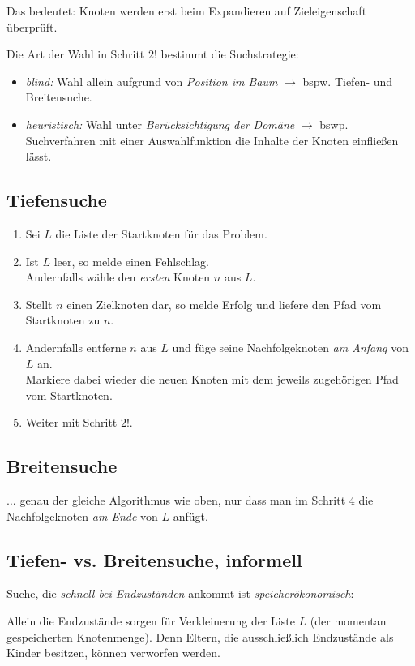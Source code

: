 \documentclass[runningheads,deutsch]{llncs}
\newenvironment{indentleft}[1]{
    \setlength{\leftskip}{#1}
}{
    \setlength{\leftskip}{0pt}
}
\begin{document}
Das bedeutet: Knoten werden erst beim Expandieren auf Zieleigenschaft überprüft.

Die Art der Wahl in Schritt $2!$ bestimmt die Suchstrategie:
\begin{itemize}
    \item \textit{blind:} Wahl allein aufgrund von \textit{Position im Baum} $\rightarrow$ bspw. Tiefen- und Breitensuche.
    \item \textit{heuristisch:} Wahl unter \textit{Berücksichtigung der Domäne} $\rightarrow$ bswp. Suchverfahren mit einer Auswahlfunktion die Inhalte der Knoten einfließen lässt.
\end{itemize}

\subsection{Tiefensuche}

\begin{enumerate}
    \item Sei $L$ die Liste der Startknoten für das Problem.
    \item Ist $L$ leer, so melde einen Fehlschlag. \\
          Andernfalls wähle den \textit{ersten} Knoten $n$ aus $L$.
    \item Stellt $n$ einen Zielknoten dar, so melde Erfolg und liefere den Pfad vom Startknoten zu $n$.
    \item Andernfalls entferne $n$ aus $L$ und füge seine Nachfolgeknoten \textit{am Anfang} von $L$ an. \\
          Markiere dabei wieder die neuen Knoten mit dem jeweils zugehörigen Pfad vom Startknoten.
    \item Weiter mit Schritt $2!$.
\end{enumerate}

\subsection{Breitensuche}
$\dots$ genau der gleiche Algorithmus wie oben, nur dass man im Schritt 4 die Nachfolgeknoten \textit{am Ende} von $L$ anfügt.

\subsection{Tiefen- vs. Breitensuche, informell}

Suche, die \textit{schnell bei Endzuständen} ankommt ist \textit{speicherökonomisch}:
\begin{indentleft}{1cm}
    Allein die Endzustände sorgen für Verkleinerung der Liste $L$ (der momentan gespeicherten Knotenmenge). Denn Eltern, die ausschließlich Endzustände als Kinder besitzen, können verworfen werden.
\end{indentleft}
\end{document}
